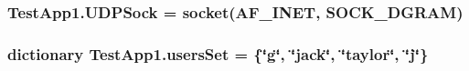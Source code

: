 \subsubsection[{\texorpdfstring{U\+D\+P\+Sock}{UDPSock}}]{\setlength{\rightskip}{0pt plus 5cm}Test\+App1.\+U\+D\+P\+Sock = socket(A\+F\+\_\+\+I\+N\+ET, S\+O\+C\+K\+\_\+\+D\+G\+R\+AM)}\hypertarget{namespaceTestApp1_a4386f942521f81813915fef86956135c}{}\label{namespaceTestApp1_a4386f942521f81813915fef86956135c}
\subsubsection[{\texorpdfstring{users\+Set}{usersSet}}]{\setlength{\rightskip}{0pt plus 5cm}dictionary Test\+App1.\+users\+Set = \{\char`\"{}g\char`\"{}, \char`\"{}jack\char`\"{}, \char`\"{}taylor\char`\"{}, \char`\"{}j\char`\"{}\}}\hypertarget{namespaceTestApp1_a9774a750e020395749cf1405ef7a19aa}{}\label{namespaceTestApp1_a9774a750e020395749cf1405ef7a19aa}
